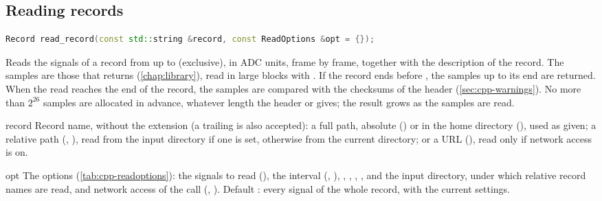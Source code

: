 \subsection{Reading records}
\label{sec:cpp-reading}

\begin{lstlisting}[language=C++,style=signature]
Record read_record(const std::string &record, const ReadOptions &opt = {});
\end{lstlisting}
Reads the signals of a record from  up to  (exclusive), in
ADC units, frame by frame, together with the description of the record. The samples are
those that  returns (\cref{chap:library}), read in large blocks with
. If the record ends before , the samples up to its end are
returned. When the read reaches the end of the record, the samples are compared with the
checksums of the header (\cref{sec:cpp-warnings}). No more than $2^{26}$ samples are
allocated in advance, whatever length the header or  gives; the result grows
as the samples are read.
\begin{params}
\item[record] Record name, without the  extension (a trailing  is
  also accepted): a full path, absolute () or in the home
  directory (), used as given; a relative path
  (, ), read from the input directory if one is set,
  otherwise from the current directory; or a URL
  (), read only if network access is
  on.
\item[opt] The options (\cref{tab:cpp-readoptions}): the signals to read
  (), the interval (, ), , ,
  , , and the input directory, under which relative
  record names are read, and network access of the call (,
  ). Default \code{\{\}}: every signal of the
  whole record, with the current settings.
\end{params}
